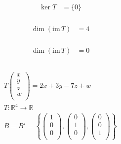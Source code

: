 \documentclass[fleqn, a4paper]{amsart}
\theoremstyle{definition}
\theoremstyle{theorem}
\theoremstyle{remark}
\newcommand{\im}{\mathrm{im}\,}
\numberwithin{corollary}{theorem}
\numberwithin{equation}{theorem}
\begin{document}
\begin{multicols}{1}
\subsubsection{}

\begin{align*}
	\ker T &= \{0\}
\end{align*}

\subsubsection{}

\begin{align*}
	\dim (\im T) &= 4
\end{align*}

\subsubsection{}

\begin{align*}
	\dim (\im T) &= 0
\end{align*}

\subsection{}

\begin{gather*}
	T 
		\begin{pmatrix}
			x\\
			y\\
			z\\
			w\\
		\end{pmatrix}
	= 2x + 3y - 7z + w\\
	T : \mathbb{R}^4 \to \mathbb{R}\\
	B = B' = 
		\left\lbrace
			\begin{pmatrix}
				1\\
				0\\
				0\\
			\end{pmatrix}
			,
			\begin{pmatrix}
				0\\
				1\\
				0\\
			\end{pmatrix}
			,
			\begin{pmatrix}
				0\\
				0\\
				1\\
			\end{pmatrix}
		\right\rbrace
\end{gather*}


\end{multicols}
\end{document}

